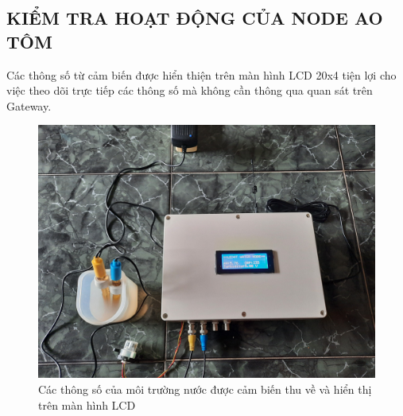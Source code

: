 \subsection{KIỂM TRA HOẠT ĐỘNG CỦA NODE AO TÔM}
\indent Các thông số từ cảm biến được hiển thiện trên màn hình LCD 20x4 tiện lợi cho việc theo dõi trực tiếp các thông số mà không cần thông qua quan sát trên Gateway.
\begin{figure}[H]
	\centering
	\includegraphics[scale=0.1]{Chapter 4/image chapter 4/aotomNode.jpg}
	\caption[Các thông số của môi trường nước được cảm biến thu về và hiển thị trên màn hình LCD]{Các thông số của môi trường nước được cảm biến thu về và hiển thị trên màn hình LCD}
\end{figure}
